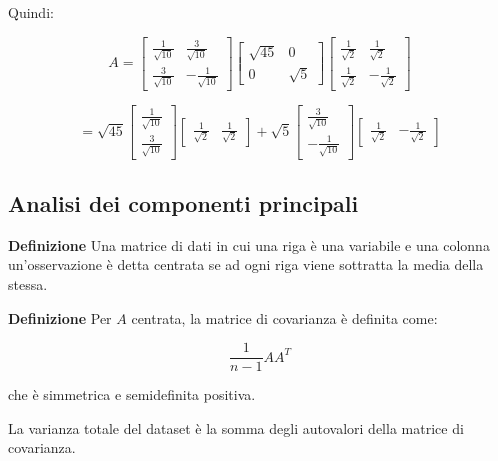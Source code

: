 \documentclass{article}
\newcommand{\df}{\noindent\textbf{Definizione} }
\begin{document}
\textbf{}

Quindi:

\[
A=
\begin{bmatrix}
\frac{1}{\sqrt{10}} & \frac{3}{\sqrt{10}}\\
\frac{3}{\sqrt{10}} & -\frac{1}{\sqrt{10}}
\end{bmatrix}
\begin{bmatrix}
\sqrt{45} & 0\\
0 & \sqrt{5}
\end{bmatrix}
\begin{bmatrix}
\frac{1}{\sqrt{2}} & \frac{1}{\sqrt{2}}\\
\frac{1}{\sqrt{2}} & -\frac{1}{\sqrt{2}}
\end{bmatrix}
\]

\[
=
\sqrt{45}
\begin{bmatrix}
\frac{1}{\sqrt{10}}\\
\frac{3}{\sqrt{10}}
\end{bmatrix}
\begin{bmatrix}
\frac{1}{\sqrt{2}} & \frac{1}{\sqrt{2}}
\end{bmatrix}
+
\sqrt{5}
\begin{bmatrix}
\frac{3}{\sqrt{10}}\\
-\frac{1}{\sqrt{10}}
\end{bmatrix}
\begin{bmatrix}
\frac{1}{\sqrt{2}} & -\frac{1}{\sqrt{2}}
\end{bmatrix}
\]

\newpage

\subsection{Analisi dei componenti principali}

\df Una matrice di dati in cui una riga è una variabile e una colonna un'osservazione è detta centrata se ad ogni riga viene sottratta la media della stessa.\newline

\df Per $A$ centrata, la matrice di covarianza è definita come:

$$\frac{1}{n-1}AA^T$$

\vspace{5pt}

che è simmetrica e semidefinita positiva.\newline

La varianza totale del dataset è la somma degli autovalori della matrice di covarianza.\newline
\end{document}
